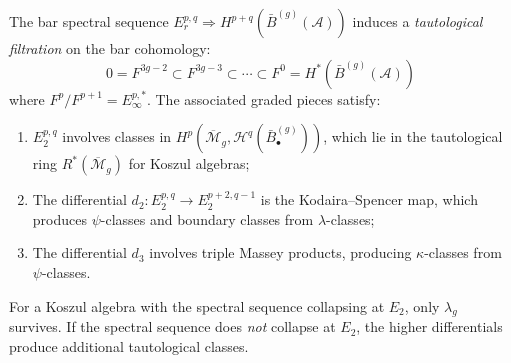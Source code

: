 \begin{proposition}\label{prop:bar-tautological-filtration}
The bar spectral sequence
$E_r^{p,q} \Rightarrow H^{p+q}(\bar{B}^{(g)}(\mathcal{A}))$
induces a \emph{tautological filtration} on the bar cohomology:
\begin{equation}\label{eq:tauto-filtration}
0 = F^{3g-2} \subset F^{3g-3} \subset \cdots \subset F^0 =
H^*(\bar{B}^{(g)}(\mathcal{A}))
\end{equation}
where $F^p / F^{p+1} = E_\infty^{p,*}$.  The associated graded
pieces satisfy:
\begin{enumerate}[label=\textup{(\roman*)}]
\item $E_2^{p,q}$ involves classes in
  $H^p(\overline{\mathcal{M}}_g, \mathcal{H}^q(\bar{B}^{(g)}_\bullet))$,
  which lie in the tautological ring $R^*(\overline{\mathcal{M}}_g)$
  for Koszul algebras;
\item The differential $d_2\colon E_2^{p,q} \to E_2^{p+2,q-1}$
  is the Kodaira--Spencer map, which produces $\psi$-classes and
  boundary classes from $\lambda$-classes;
\item The differential $d_3$ involves triple Massey products,
  producing $\kappa$-classes from $\psi$-classes.
\end{enumerate}
For a Koszul algebra with the spectral sequence collapsing at
$E_2$, only $\lambda_g$ survives.  If the spectral sequence does
\emph{not} collapse at $E_2$, the higher differentials produce
additional tautological classes.
\end{proposition}


